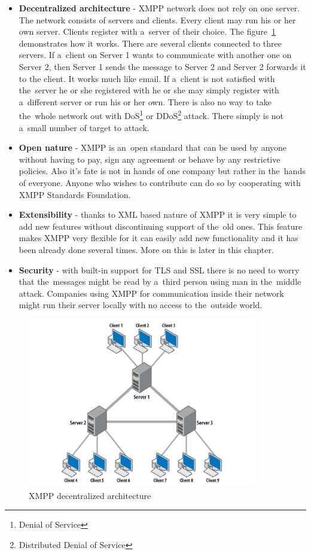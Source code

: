 \begin{itemize}
	\item \textbf{Decentralized architecture} - XMPP network does not rely on one server. The network consists of servers and clients. Every client may run his or her own server. Clients register with a~server of their choice. The figure~\ref{fig:xmpp-decentralized-architecture} demonstrates how it works. There are several clients connected to three servers. If a~client on Server 1 wants to communicate with another one on Server 2, then Server 1 sends the message to Server 2 and Server 2 forwards it to the client. It works much like email. If a~client is not satisfied with the~server he or she registered with he or she may simply register with a~different server or run his or her own. There is also no way to take the~whole network out with DoS\footnote{Denial of Service} or DDoS\footnote{Distributed Denial of Service} attack. There simply is not a~small number of target to attack.    
	\item  \textbf{Open nature} - XMPP is an~open standard that can be used by anyone without having to pay, sign any agreement or behave by any restrictive policies. Also it's fate is not in hands of one company but rather in the~hands of everyone. Anyone who wishes to contribute can do so by cooperating with XMPP Standards Foundation. 
	\item \textbf{Extensibility} - thanks to XML based nature of XMPP it is very simple to add new features without discontinuing support of the~old ones. This feature makes XMPP very flexible for it can easily add new functionality and it has been already done several times. More on this is later in this chapter. 
	\item \textbf{Security} - with built-in support for TLS and SSL there is no need to worry that the~messages might be read by a~third person using man in the~middle attack. Companies using XMPP for communication inside their network might run their server locally with no access to the~outside world.  
\end{itemize}

\begin{figure}[ht]
\begin{center}
	\includegraphics[width=10cm]{fig/XMPP-decentralized-architecture.png}
	\caption{XMPP decentralized architecture~\cite{xmppBook}}
	\label{fig:xmpp-decentralized-architecture}
\end{center}
\end{figure}

